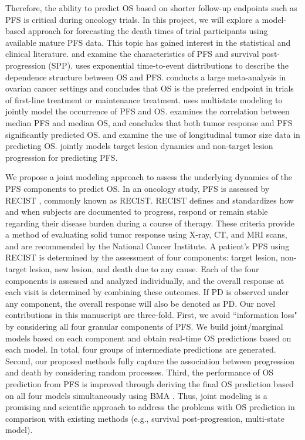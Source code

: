 Therefore, the ability to predict \ac{OS} based on shorter follow-up endpoints such as \ac{PFS} is critical during oncology trials. In this project, we will explore a model-based approach for forecasting the death times of trial participants using available mature \ac{PFS} data. This topic has gained interest in the statistical and clinical literature. \cite{broglio2009detecting} and \cite{morita2015detecting} examine the characteristics of \ac{PFS} and survival post-progression (SPP). \cite{fleischer2009statistical} uses exponential time-to-event distributions to describe the dependence structure between \ac{OS} and \ac{PFS}. \cite{paoletti2020assessment} conducts a large meta-analysis in ovarian cancer settings and concludes that \ac{OS} is the preferred endpoint in trials of first-line treatment or maintenance treatment. \cite{meller2019joint} uses multistate modeling to jointly model the occurrence of \ac{PFS} and \ac{OS}. \cite{shukuya2016relationship} examines the correlation between median \ac{PFS} and median \ac{OS}, and concludes that both tumor response and \ac{PFS} significantly predicted \ac{OS}. \cite{claret2009model, claret2013evaluation, wang2009elucidation,bruno2014evaluation, zecchin2016models} and \cite{lim2019predicting} examine the use of longitudinal tumor size data in predicting \ac{OS}. \cite{yu2020new} jointly models target lesion dynamics and non-target lesion progression for predicting \ac{PFS}. 

We propose a joint modeling approach to assess the underlying dynamics of the \ac{PFS} components to predict \ac{OS}. In an oncology study, \ac{PFS} is assessed by \acl{RECIST} \citep{eisenhauer2009new}, commonly known as \acs{RECIST}. \acs{RECIST} defines and standardizes how and when subjects are documented to progress, respond or remain stable regarding their disease burden during a course of therapy. These criteria provide a method of evaluating solid tumor response using X-ray, CT, and MRI scans, and are recommended by the National Cancer Institute. A patient's \ac{PFS} using \acs{RECIST} is determined by the assessment of four components: target lesion, non-target lesion, new lesion, and death due to any cause. Each of the four components is assessed and analyzed individually, and the overall response at each visit is determined by combining these outcomes. If \ac{PD} is observed under any component, the overall response will also be denoted as \ac{PD}. Our novel contributions in this manuscript are three-fold. First, we avoid ``information loss" by considering all four granular components of \ac{PFS}. We build joint/marginal models based on each component and obtain real-time \ac{OS} predictions based on each model. In total, four groups of intermediate predictions are generated. Second, our proposed methods fully capture the association between progression and death by considering random processes. Third, the performance of \ac{OS} prediction from \ac{PFS} is improved through deriving the final \ac{OS} prediction based on all four models simultaneously using \ac{BMA} \citep{hoeting1999bayesian}. Thus, joint modeling is a promising and scientific approach to address the problems with \ac{OS} prediction in comparison with existing methods (e.g., survival post-progression, multi-state model). 

